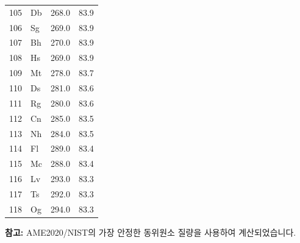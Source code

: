 \documentclass[12pt,a4paper]{article}
\begin{document}
\begin{longtable}{c l c c}
		105& Db  & 268.0  & 83.9 \\
		106& Sg  & 269.0  & 83.9 \\
		107& Bh  & 270.0  & 83.9 \\
		108& Hs  & 269.0  & 83.9 \\
		109& Mt  & 278.0  & 83.7 \\
		110& Ds  & 281.0  & 83.6 \\
		111& Rg  & 280.0  & 83.6 \\
		112& Cn  & 285.0  & 83.5 \\
		113& Nh  & 284.0  & 83.5 \\
		114& Fl  & 289.0  & 83.4 \\
		115& Mc  & 288.0  & 83.4 \\
		116& Lv  & 293.0  & 83.3 \\
		117& Ts  & 292.0  & 83.3 \\
		118& Og  & 294.0  & 83.3 \\
		\bottomrule
	\end{longtable}
	\vspace{0.5cm}
	\noindent
	\textbf{참고:} AME2020/NIST의 가장 안정한 동위원소 질량을 사용하여 계산되었습니다.
	
	\clearpage
	
\end{document}
